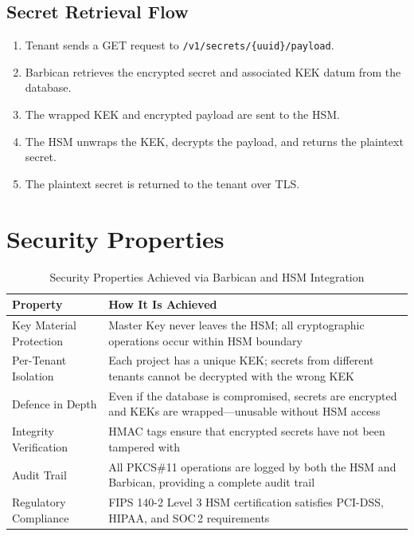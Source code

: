 \documentclass[12pt,a4paper,oneside]{report}
\begin{document}
\subsection{Secret Retrieval Flow}

\begin{enumerate}
    \item Tenant sends a GET request to \texttt{/v1/secrets/\{uuid\}/payload}.
    \item Barbican retrieves the encrypted secret and associated KEK datum from the database.
    \item The wrapped KEK and encrypted payload are sent to the HSM.
    \item The HSM unwraps the KEK, decrypts the payload, and returns the plaintext secret.
    \item The plaintext secret is returned to the tenant over TLS.
\end{enumerate}

\section{Security Properties}

\begin{table}[h]
\centering
\begin{tabular}{@{} l p{9cm} @{}}
\toprule
\textbf{Property} & \textbf{How It Is Achieved} \\
\midrule
Key Material Protection & Master Key never leaves the HSM; all cryptographic operations occur within HSM boundary \\
Per-Tenant Isolation & Each project has a unique KEK; secrets from different tenants cannot be decrypted with the wrong KEK \\
Defence in Depth & Even if the database is compromised, secrets are encrypted and KEKs are wrapped—unusable without HSM access \\
Integrity Verification & HMAC tags ensure that encrypted secrets have not been tampered with \\
Audit Trail & All PKCS\#11 operations are logged by both the HSM and Barbican, providing a complete audit trail \\
Regulatory Compliance & FIPS 140-2 Level 3 HSM certification satisfies PCI-DSS, HIPAA, and SOC\,2 requirements \\
\bottomrule
\end{tabular}
\caption{Security Properties Achieved via Barbican and HSM Integration}
\label{tab:barbican-security-properties}
\end{table}
\end{document}
